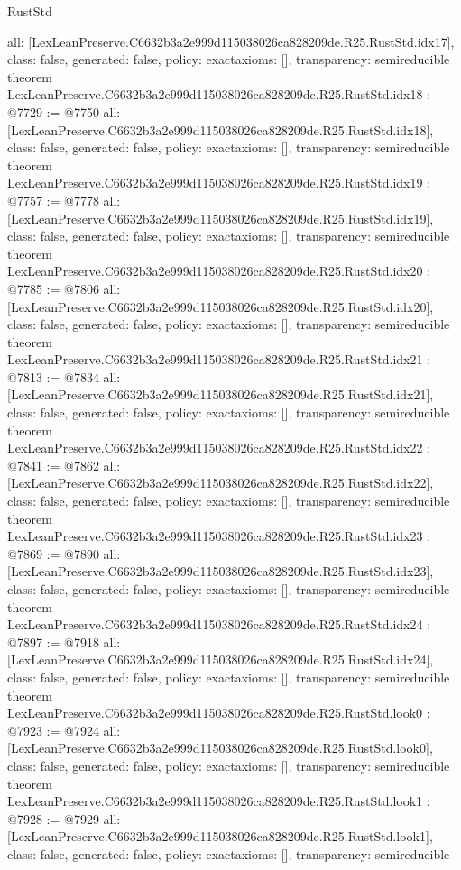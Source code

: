 \begin{lexlean}{RustStd}
\begin{coremodule}
{  all: [LexLeanPreserve.C6632b3a2e999d115038026ca828209de.R25.RustStd.idx17],
  class: false,
  generated: false,
  policy: exact{axioms: []},
  transparency: semireducible
}
theorem LexLeanPreserve.C6632b3a2e999d115038026ca828209de.R25.RustStd.idx18 : @7729 := @7750 {
  all: [LexLeanPreserve.C6632b3a2e999d115038026ca828209de.R25.RustStd.idx18],
  class: false,
  generated: false,
  policy: exact{axioms: []},
  transparency: semireducible
}
theorem LexLeanPreserve.C6632b3a2e999d115038026ca828209de.R25.RustStd.idx19 : @7757 := @7778 {
  all: [LexLeanPreserve.C6632b3a2e999d115038026ca828209de.R25.RustStd.idx19],
  class: false,
  generated: false,
  policy: exact{axioms: []},
  transparency: semireducible
}
theorem LexLeanPreserve.C6632b3a2e999d115038026ca828209de.R25.RustStd.idx20 : @7785 := @7806 {
  all: [LexLeanPreserve.C6632b3a2e999d115038026ca828209de.R25.RustStd.idx20],
  class: false,
  generated: false,
  policy: exact{axioms: []},
  transparency: semireducible
}
theorem LexLeanPreserve.C6632b3a2e999d115038026ca828209de.R25.RustStd.idx21 : @7813 := @7834 {
  all: [LexLeanPreserve.C6632b3a2e999d115038026ca828209de.R25.RustStd.idx21],
  class: false,
  generated: false,
  policy: exact{axioms: []},
  transparency: semireducible
}
theorem LexLeanPreserve.C6632b3a2e999d115038026ca828209de.R25.RustStd.idx22 : @7841 := @7862 {
  all: [LexLeanPreserve.C6632b3a2e999d115038026ca828209de.R25.RustStd.idx22],
  class: false,
  generated: false,
  policy: exact{axioms: []},
  transparency: semireducible
}
theorem LexLeanPreserve.C6632b3a2e999d115038026ca828209de.R25.RustStd.idx23 : @7869 := @7890 {
  all: [LexLeanPreserve.C6632b3a2e999d115038026ca828209de.R25.RustStd.idx23],
  class: false,
  generated: false,
  policy: exact{axioms: []},
  transparency: semireducible
}
theorem LexLeanPreserve.C6632b3a2e999d115038026ca828209de.R25.RustStd.idx24 : @7897 := @7918 {
  all: [LexLeanPreserve.C6632b3a2e999d115038026ca828209de.R25.RustStd.idx24],
  class: false,
  generated: false,
  policy: exact{axioms: []},
  transparency: semireducible
}
theorem LexLeanPreserve.C6632b3a2e999d115038026ca828209de.R25.RustStd.look0 : @7923 := @7924 {
  all: [LexLeanPreserve.C6632b3a2e999d115038026ca828209de.R25.RustStd.look0],
  class: false,
  generated: false,
  policy: exact{axioms: []},
  transparency: semireducible
}
theorem LexLeanPreserve.C6632b3a2e999d115038026ca828209de.R25.RustStd.look1 : @7928 := @7929 {
  all: [LexLeanPreserve.C6632b3a2e999d115038026ca828209de.R25.RustStd.look1],
  class: false,
  generated: false,
  policy: exact{axioms: []},
  transparency: semireducible
}
\end{coremodule}
\end{lexlean}
